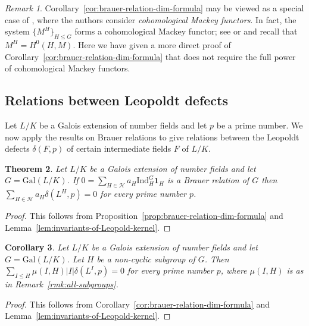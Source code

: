 \documentclass[12pt]{amsart}
\theoremstyle{plain}
\newtheorem{theorem}{Theorem}[section]
\newtheorem{corollary}[theorem]{Corollary}
\theoremstyle{remark}
\newtheorem{remark}[theorem]{Remark}
\theoremstyle{definition}
\newcommand{\Gal}{\mathrm{Gal}}
\newcommand{\Ind}{\mathrm{Ind}}
\numberwithin{equation}{section}
\begin{document}
\begin{remark}
Corollary~\ref{cor:brauer-relation-dim-formula} may be viewed as a special case of 
\cite[Theorem~1.2]{MR2032439}, where the authors consider \emph{cohomological Mackey functors}. In fact, the system $\{ M^{H} \}_{H \leq G}$ forms a cohomological Mackey functor; 
see  \cite[Example~1.2]{MR1473884} or \cite[Example~2.5(d)]{MR2032439}
and recall that $M^{H}=H^{0}(H,M)$. 
Here we have given a more direct proof of Corollary~\ref{cor:brauer-relation-dim-formula}
that does not require the full power of cohomological Mackey functors. 
\end{remark}

\subsection{Relations between Leopoldt defects}\label{subsec:relations-Leo-defects}
Let $L/K$ be a Galois extension of number fields and let $p$ be a prime number.
We now apply the results on Brauer relations to give relations between 
the Leopoldt defects $\delta(F,p)$ of certain intermediate fields $F$ of $L/K$. 

\begin{theorem}\label{thm:Brauer-rels-Leopoldt-defect}
Let $L/K$ be a Galois extension of number fields and let $G=\Gal(L/K)$. 
If $0=\sum_{H \in \mathcal{H}} a_{H} \Ind_{H}^{G}\mathbf{1}_{H}$ is a Brauer relation of $G$
then $\sum_{H \in \mathcal{H}} a_{H} \delta(L^{H},p) = 0$ for every prime number $p$.
\end{theorem}

\begin{proof}
This follows from Proposition~\ref{prop:brauer-relation-dim-formula} and
Lemma~\ref{lem:invariants-of-Leopold-kernel}.
\end{proof}

\begin{corollary}\label{cor:mu-idempotent-relations}
Let $L/K$ be a Galois extension of number fields and let $G=\Gal(L/K)$.  
Let $H$ be a non-cyclic subgroup of $G$. 
Then $\sum_{I \leq H} \mu(I,H) |I| \delta(L^{I},p) = 0$ for every prime number $p$,
where $\mu(I,H)$ is as in Remark~\ref{rmk:all-subgroups}.
\end{corollary}

\begin{proof}
This follows from Corollary~\ref{cor:brauer-relation-dim-formula} and
Lemma~\ref{lem:invariants-of-Leopold-kernel}.
\end{proof}
\end{document}
